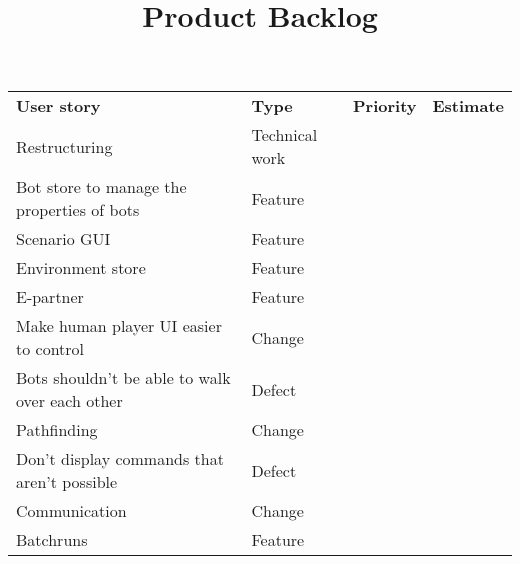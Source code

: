 \documentclass{article}
\begin{document}
\title{Product Backlog}
\date{}
\maketitle

\begin{tabular}{l l l l}
\textbf{User story} & \textbf{Type} & \textbf{Priority} & \textbf{Estimate}\\
Restructuring & Technical work & &\\
Bot store to manage the properties of bots & Feature & &\\
Scenario GUI & Feature & &\\
Environment store & Feature & &\\
E-partner & Feature & &\\
Make human player UI easier to control & Change & &\\
Bots shouldn't be able to walk over each other & Defect & &\\
Pathfinding & Change & & \\
Don't display commands that aren't possible & Defect & &\\
Communication & Change & &\\
Batchruns & Feature & &\\
\end{tabular}
\end{document}

